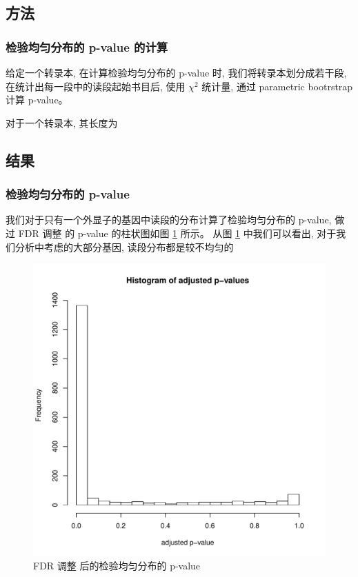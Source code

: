 \subsection{方法}
\subsubsection{检验均匀分布的 p-value 的计算}
给定一个转录本, 在计算检验均匀分布的 p-value 时, 
我们将转录本划分成若干段, 在统计出每一段中的读段起始书目后, 使用 $\chi^2$ 统计量, 
通过 parametric bootrstrap \cite{efron1993introduction} 计算 p-value。 

对于一个转录本, 其长度为

\subsection{结果}
\subsubsection{检验均匀分布的 p-value}
我们对于只有一个外显子的基因中读段的分布计算了检验均匀分布的 p-value, 
做过 FDR 调整 \cite{benjamini1995controlling} 的 p-value 
的柱状图如图 \ref{nonunif-adj-unif-pval} 所示。 
从图 \ref{nonunif-adj-unif-pval} 中我们可以看出, 
对于我们分析中考虑的大部分基因, 读段分布都是较不均匀的

\begin{figure}[!t]
\centering
\includegraphics[width=\textwidth]{figures/nonunif/padj-hist.pdf}
\caption{FDR 调整 \cite{benjamini1995controlling} 后的检验均匀分布的 p-value}
\label{nonunif-adj-unif-pval}
\end{figure}

